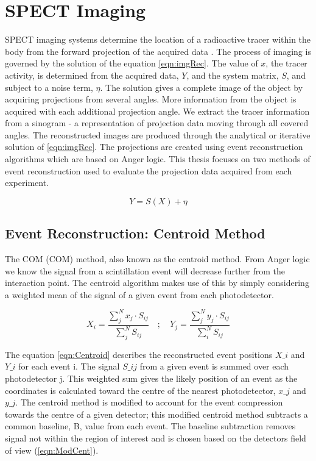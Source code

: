 \section{SPECT Imaging} %
\acrshort{SPECT} imaging systems determine the location of a radioactive tracer within the body from the forward projection of the acquired data \cite{BasicOfNM}. The process of imaging is governed by the solution of the equation \ref{eqn:imgRec}. The value of $x$, the tracer activity, is determined from the acquired data, $Y$, and the system matrix, $S$, and subject to a noise term, $\eta$. The solution gives a complete image of the object by acquiring projections from several angles. More information from the object is acquired with each additional projection angle. We extract the tracer information from a sinogram - a representation of projection data moving through all covered angles. The reconstructed images are produced through the analytical or iterative solution of \ref{eqn:imgRec}. The projections are created using event reconstruction algorithms which are based on Anger logic. This thesis focuses on two methods of event reconstruction used to evaluate the projection data acquired from each experiment.

\begin{equation} \label{eqn:imgRec}
        Y = S(X) + \eta 
\end{equation}

\subsection{Event Reconstruction: Centroid Method}
The \acrlong{COM} (\acrshort{COM}) method, also known as the centroid method. From Anger logic we know the signal from a scintillation event will decrease further from the interaction point. The centroid algorithm makes use of this by simply considering a weighted mean of the signal of a given event from each photodetector. 

\begin{equation} \label{eqn:Centroid}
        X_{i} = \frac{\sum^{N}_{j} x_{j} \cdot S_{ij}}{\sum^{N}_{j} S_{ij}} \quad ; \quad  Y_{j} = \frac{\sum^{N}_{j} y_{j} \cdot S_{ij}}{\sum^{N}_{i} S_{ij}}
\end{equation}

The equation \ref{eqn:Centroid} describes the reconstructed event positions $X\_i$ and $Y\_i$ for each event i. The signal $S\_{ij}$ from a given event is summed over each  photodetector j. This weighted sum gives the likely position of an event as the coordinates is calculated toward the centre of the nearest photodetector, $x\_j$ and $y\_j$. The centroid method is modified to account for the event compression towards the centre of a given detector; this modified centroid method subtracts a common baseline, B, value from each event. The baseline subtraction removes signal not within the region of interest and is chosen based on the detectors field of view (\ref{eqn:ModCent}). 

